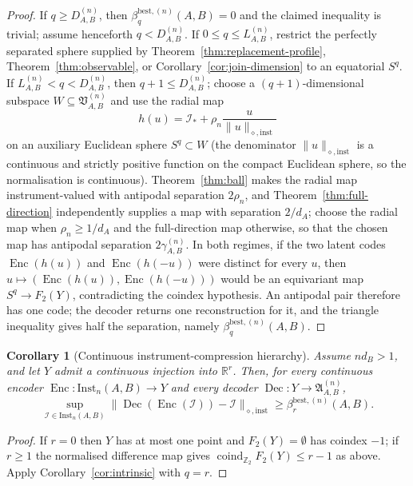 \documentclass[11pt,a4paper]{article}
\newtheorem{corollary}[theorem]{Corollary}
\newcommand{\Inst}{\mathrm{Inst}}
\newcommand{\coind}{\operatorname{coind}_{\mathbb Z_2}}
\begin{document}
\begin{proof}
If $q\ge D_{A,B}^{(n)}$, then $\beta_q^{\mathrm{best},(n)}(A,B)=0$ and the claimed inequality is trivial; assume henceforth $q<D_{A,B}^{(n)}$. If $0\le q\le L_{A,B}^{(n)}$, restrict the perfectly separated sphere supplied by Theorem~\ref{thm:replacement-profile}, Theorem~\ref{thm:observable}, or Corollary~\ref{cor:join-dimension} to an equatorial $S^q$. If $L_{A,B}^{(n)}<q<D_{A,B}^{(n)}$, then $q+1\le D_{A,B}^{(n)}$; choose a $(q+1)$-dimensional subspace $W\subseteq\mathfrak V_{A,B}^{(n)}$ and use the radial map
\[
h(u)=\mathcal I_*+\rho_n\frac{u}{\|u\|_{\diamond,\mathrm{inst}}}
\]
on an auxiliary Euclidean sphere $S^q\subset W$ (the denominator $\|u\|_{\diamond,\mathrm{inst}}$ is a continuous and strictly positive function on the compact Euclidean sphere, so the normalisation is continuous). Theorem~\ref{thm:ball} makes the radial map instrument-valued with antipodal separation $2\rho_n$, and Theorem~\ref{thm:full-direction} independently supplies a map with separation $2/d_A$; choose the radial map when $\rho_n\ge1/d_A$ and the full-direction map otherwise, so that the chosen map has antipodal separation $2\gamma_{A,B}^{(n)}$. In both regimes, if the two latent codes $\operatorname{Enc}(h(u))$ and $\operatorname{Enc}(h(-u))$ were distinct for every $u$, then $u\mapsto(\operatorname{Enc}(h(u)),\operatorname{Enc}(h(-u)))$ would be an equivariant map $S^q\to F_2(Y)$, contradicting the coindex hypothesis. An antipodal pair therefore has one code; the decoder returns one reconstruction for it, and the triangle inequality gives half the separation, namely $\beta_q^{\mathrm{best},(n)}(A,B)$.
\end{proof}

\begin{corollary}[Continuous instrument-compression hierarchy]
\label{cor:euclidean}
Assume $nd_B>1$, and let $Y$ admit a continuous injection into $\mathbb R^r$. Then, for every continuous encoder $\operatorname{Enc}:\Inst_n(A,B)\to Y$ and every decoder $\operatorname{Dec}:Y\to\mathfrak A_{A,B}^{(n)}$,
\[
\sup_{\mathcal I\in\Inst_n(A,B)}
\|\operatorname{Dec}(\operatorname{Enc}(\mathcal I))-\mathcal I\|_{\diamond,\mathrm{inst}}
\ge\beta_r^{\mathrm{best},(n)}(A,B).
\]
\end{corollary}

\begin{proof}
If $r=0$ then $Y$ has at most one point and $F_2(Y)=\emptyset$ has coindex $-1$; if $r\ge1$ the normalised difference map gives $\coind F_2(Y)\le r-1$ as above. Apply Corollary~\ref{cor:intrinsic} with $q=r$.
\end{proof}
\end{document}

